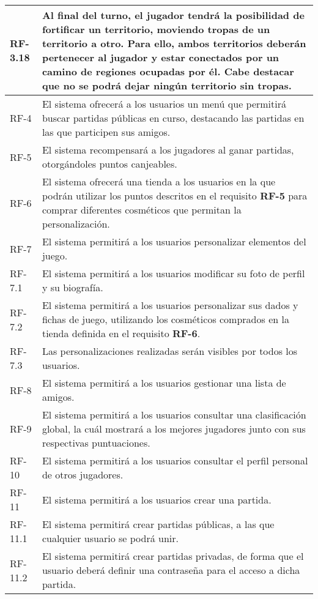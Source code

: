 \documentclass[11pt, a4paper, titlepage]{article}
\begin{document}
\begin{longtable}[h!]{| p{} | p{} |}
         \hline
         RF-3.18 & Al final del turno, el jugador tendrá la posibilidad de fortificar un territorio, moviendo tropas de un territorio a otro. Para ello, ambos territorios deberán pertenecer al jugador y estar conectados por un camino de regiones ocupadas por él. Cabe destacar que no se podrá dejar ningún territorio sin tropas.\\
         \hline
         RF-4 & El sistema ofrecerá a los usuarios un menú que permitirá buscar partidas públicas en curso, destacando las partidas en las que participen sus amigos.\\
         \hline
         RF-5 & El sistema recompensará a los jugadores al ganar partidas, otorgándoles puntos canjeables.\\
         \hline
         RF-6 & El sistema ofrecerá una tienda a los usuarios en la que podrán utilizar los puntos descritos en el requisito \textbf{RF-5} para comprar diferentes cosméticos que permitan la personalización. \\
         \hline
         RF-7 & El sistema permitirá a los usuarios personalizar elementos del juego.\\
         \hline
         RF-7.1 & El sistema permitirá a los usuarios modificar su foto de perfil y su biografía.\\
         \hline
         RF-7.2 & El sistema permitirá a los usuarios personalizar sus dados y fichas de juego, utilizando los cosméticos comprados en la tienda definida en el requisito \textbf{RF-6}.\\
         \hline
         RF-7.3 & Las personalizaciones realizadas serán visibles por todos los usuarios.\\
         \hline
         RF-8 & El sistema permitirá a los usuarios gestionar una lista de amigos.\\
         \hline
         RF-9 & El sistema permitirá a los usuarios consultar una clasificación global, la cuál mostrará a los mejores jugadores junto con sus respectivas puntuaciones.\\
         \hline
         RF-10 & El sistema permitirá a los usuarios consultar el perfil personal de otros jugadores.\\
         \hline
         RF-11 & El sistema permitirá a los usuarios crear una partida.\\
         \hline
         RF-11.1 & El sistema permitirá crear partidas públicas, a las que cualquier usuario se podrá unir.\\
         \hline
         RF-11.2 & El sistema permitirá crear partidas privadas, de forma que el usuario deberá definir una contraseña para el acceso a dicha partida.\\

\end{longtable}
\end{document}
